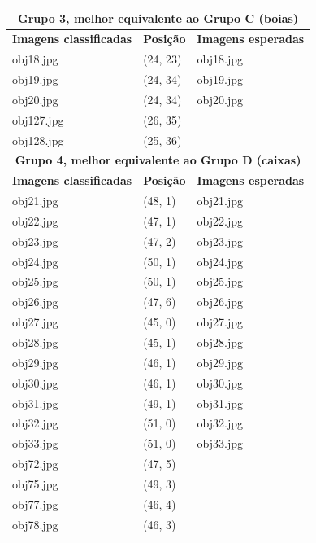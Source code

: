 \begin{center}
\begin{longtable}{|l|l|l|}
    \multicolumn{3}{|c|}{\textbf{Grupo 3, melhor equivalente ao Grupo C (boias)}} \\
    \hline\hline
    \textbf{Imagens classificadas} & \textbf{Posição} & \textbf{Imagens esperadas} \\
    \hline\hline

    obj18.jpg  & (24, 23) & obj18.jpg \\
    \hline
    obj19.jpg  & (24, 34) & obj19.jpg \\
    \hline
    obj20.jpg  & (24, 34) & obj20.jpg \\
    \hline
    obj127.jpg & (26, 35) & \\
    \hline
    obj128.jpg & (25, 36) & \\
    \hline\hline

    \multicolumn{3}{|c|}{\textbf{Grupo 4, melhor equivalente ao Grupo D (caixas)}} \\
    \hline\hline
    \textbf{Imagens classificadas} & \textbf{Posição} & \textbf{Imagens esperadas} \\
    \hline\hline

    obj21.jpg & (48, 1) & obj21.jpg \\
    \hline
    obj22.jpg & (47, 1) & obj22.jpg \\
    \hline
    obj23.jpg & (47, 2) & obj23.jpg \\
    \hline
    obj24.jpg & (50, 1) & obj24.jpg \\
    \hline
    obj25.jpg & (50, 1) & obj25.jpg \\
    \hline
    obj26.jpg & (47, 6) & obj26.jpg \\
    \hline
    obj27.jpg & (45, 0) & obj27.jpg \\
    \hline
    obj28.jpg & (45, 1) & obj28.jpg \\
    \hline
    obj29.jpg & (46, 1) & obj29.jpg \\
    \hline
    obj30.jpg & (46, 1) & obj30.jpg \\
    \hline
    obj31.jpg & (49, 1) & obj31.jpg \\
    \hline
    obj32.jpg & (51, 0) & obj32.jpg \\
    \hline
    obj33.jpg & (51, 0) & obj33.jpg \\
    \hline
    obj72.jpg & (47, 5) & \\
    \hline
    obj75.jpg & (49, 3) & \\
    \hline
    obj77.jpg & (46, 4) & \\
    \hline
    obj78.jpg & (46, 3) & \\
    \hline\hline


\end{longtable}
\end{center}
